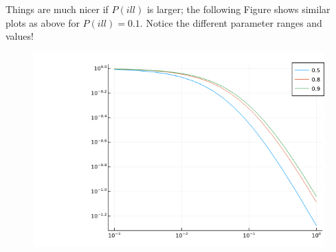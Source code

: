 Things are much nicer if $P(ill)$ is larger; the following Figure shows similar plots as above for $P(ill)=0.1$. Notice the different parameter ranges and values!

\begin{figure}[H]
    \centering
    \includegraphics[scale=0.65]{images/bayes_illness_2.png}
\end{figure}



